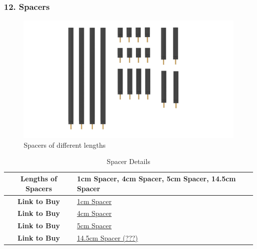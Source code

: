 \documentclass[12pt,a4paper,oneside]{book}
\begin{document}
			\subsubsection*{12. Spacers}
				\begin{figure}[H]
					\centering					
					\includegraphics[scale=1]{SPACERS TOP}
					\caption{Spacers of different lengths}	 
				\end{figure}
				\begin{table}[H]
				\centering
				\def\arraystretch{1.5}
					\caption{Spacer Details}
					\vspace{0.5cm}
					\begin{tabular}{|c||p{5cm}|}
					\hline
						\textbf{Lengths of Spacers} & 1cm Spacer, 4cm Spacer, 5cm Spacer, 14.5cm Spacer\\\hline
						\textbf{Link to Buy} & \href{https://robu.in/product/m310mm-male-to-female-nylon-hex-spacer-10pcs-copy/}{1cm Spacer}\\\hline
						\textbf{Link to Buy} & \href{https://www.electronicscomp.com/m3-x-40mm-male-to-female-brass-hex-threaded-pillar-standoff-spacer-2-pieces-pack?gclid=CjwKCAjw6fyXBhBgEiwAhhiZsguSTtz-rwfcqkDPwz9-GVv6AfvZXK3TcJzOwtoXo6S8MNRfq46vxRoCE0cQAvD_BwE}{4cm Spacer}\\\hline
						\textbf{Link to Buy} & \href{https://www.electronicscomp.com/metal-spacer-50mm-male-female?gclid=CjwKCAjw6fyXBhBgEiwAhhiZsux4DW3Xj_j21q39Tm3qviNldIP9u2m_7gQ3t3tbwMVXk955l_NgthoCCBkQAvD_BwE}{5cm Spacer}\\\hline
						\textbf{Link to Buy} & \href{???}{14.5cm Spacer (???)}\\\hline
					\end{tabular}
				\end{table}
				\pagebreak
				
\end{document}
